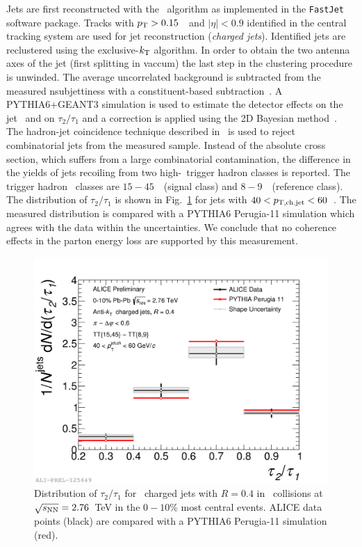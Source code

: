 \documentclass[10pt]{article}
\begin{document}
Jets are first reconstructed with the \antikt\ algorithm as implemented in the \texttt{FastJet}\cite{Cacciari:2012a} software package.
Tracks with $p_{\rm T}>0.15$~\GeVc\ and $|\eta|<0.9$ identified in the central tracking system
are used for jet reconstruction (\emph{charged jets}). 
Identified jets are reclustered using the exclusive-$k_{\rm T}$ algorithm. In order to obtain the two antenna axes of the jet (first splitting in vaccum) 
the last step in the clustering procedure is unwinded.
The average uncorrelated background is subtracted from the measured nsubjettiness with a constituent-based subtraction~\cite{Berta:2014}.
A PYTHIA6+GEANT3 simulation is used to estimate the detector effects on the jet \pt\ and on $\tau_2/\tau_1$ and a correction is applied using the 2D Bayesian method~\cite{Dagostini:1995}.
The hadron-jet coincidence technique described in~\cite{ALICE:2015g} is used to reject combinatorial jets from the measured sample. 
Instead of the absolute cross section, which suffers from a large combinatorial contamination, the difference in the yields of jets recoiling from two high-\pt\ trigger hadron classes is reported. 
The trigger hadron \pt\ classes are $15-45$~\GeVc\ (signal class) and $8-9$~\GeVc\ (reference class). The distribution of $\tau_2/\tau_1$ is shown in Fig.~\ref{fig:nsubjettiness} for jets with $40<p_{\rm T,ch.jet}<60$~\GeVc.
The measured distribution is compared with a PYTHIA6 Perugia-11 simulation which agrees with the data within the uncertainties. We conclude that no coherence effects in the parton energy loss are supported by this measurement.
\begin{figure}[tb]
\centering
\includegraphics[width=.5\textwidth]{img/2017-Feb-03-Tau2to1_40to60_Full_Results_0}
\caption{Distribution of $\tau_2/\tau_1$ for \antikt\ charged jets with $R=0.4$ in \PbPb\ collisions at $\sqrt{s_{\rm NN}}=2.76$~TeV in the $0-10$\% most central events. 
ALICE data points (black) are compared with a PYTHIA6 Perugia-11 simulation (red).}
\label{fig:nsubjettiness}
\end{figure}
\end{document}
